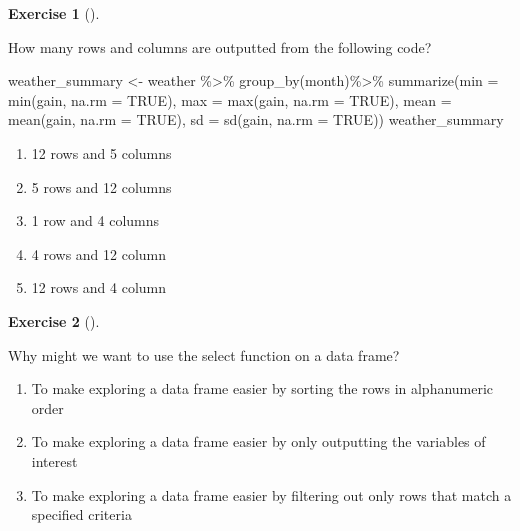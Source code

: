 \documentclass[
  letterpaper,
  DIV=11,
  numbers=noendperiod]{scrreprt}
\newenvironment{Shaded}{\begin{snugshade}}{\end{snugshade}}
\newcommand{\AttributeTok}[1]{\textcolor[rgb]{0.40,0.45,0.13}{#1}}
\newcommand{\ConstantTok}[1]{\textcolor[rgb]{0.56,0.35,0.01}{#1}}
\newcommand{\FunctionTok}[1]{\textcolor[rgb]{0.28,0.35,0.67}{#1}}
\newcommand{\NormalTok}[1]{\textcolor[rgb]{0.00,0.23,0.31}{#1}}
\newcommand{\OtherTok}[1]{\textcolor[rgb]{0.00,0.23,0.31}{#1}}
\newcommand{\SpecialCharTok}[1]{\textcolor[rgb]{0.37,0.37,0.37}{#1}}
\providecommand{\tightlist}{%
  \setlength{\itemsep}{0pt}\setlength{\parskip}{0pt}}\usepackage{longtable,booktabs,array}
\theoremstyle{definition}
\newtheorem{exercise}{Exercise}[chapter]
\theoremstyle{remark}
\begin{document}
\begin{exercise}[]\protect\hypertarget{exr-ch03-c03}{}\label{exr-ch03-c03}

How many rows and columns are outputted from the following code?

\begin{Shaded}
\begin{Highlighting}[]
\NormalTok{weather\_summary }\OtherTok{\textless{}{-}}\NormalTok{ weather }\SpecialCharTok{\%\textgreater{}\%}  
    \FunctionTok{group\_by}\NormalTok{(month)}\SpecialCharTok{\%\textgreater{}\%} 
    \FunctionTok{summarize}\NormalTok{(}\AttributeTok{min =} \FunctionTok{min}\NormalTok{(gain, }\AttributeTok{na.rm =} \ConstantTok{TRUE}\NormalTok{), }
            \AttributeTok{max =} \FunctionTok{max}\NormalTok{(gain, }\AttributeTok{na.rm =} \ConstantTok{TRUE}\NormalTok{),}
            \AttributeTok{mean =} \FunctionTok{mean}\NormalTok{(gain, }\AttributeTok{na.rm =} \ConstantTok{TRUE}\NormalTok{),  }
            \AttributeTok{sd =} \FunctionTok{sd}\NormalTok{(gain, }\AttributeTok{na.rm =} \ConstantTok{TRUE}\NormalTok{))}
\NormalTok{weather\_summary}
\end{Highlighting}
\end{Shaded}

\begin{enumerate}
\def\labelenumi{\alph{enumi}.}
\tightlist
\item
  12 rows and 5 columns
\item
  5 rows and 12 columns
\item
  1 row and 4 columns
\item
  4 rows and 12 column
\item
  12 rows and 4 column
\end{enumerate}

\end{exercise}

\begin{exercise}[]\protect\hypertarget{exr-ch03-c04}{}\label{exr-ch03-c04}

Why might we want to use the select function on a data frame?

\begin{enumerate}
\def\labelenumi{\alph{enumi})}
\tightlist
\item
  To make exploring a data frame easier by sorting the rows in
  alphanumeric order
\item
  To make exploring a data frame easier by only outputting the variables
  of interest
\item
  To make exploring a data frame easier by filtering out only rows that
  match a specified criteria
\end{enumerate}

\end{exercise}
\end{document}
